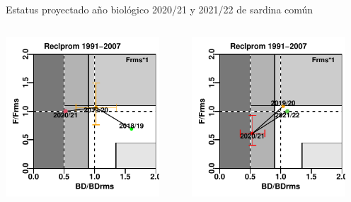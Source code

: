 \documentclass[
  ignorenonframetext,
]{beamer}
\begin{document}
\begin{frame}{Estatus proyectado año biológico 2020/21 y 2021/22 de
sardina común}
\protect\hypertarget{estatus-proyectado-auxf1o-bioluxf3gico-202021-y-202122-de-sardina-comuxfan}{}
\begin{columns}
\begin{center} \includegraphics[width=0.9\textwidth]{FigurasInforme_Marzo/Fig44a_sept-1.pdf}\end{center}
\begin{center} \includegraphics[width=0.9\textwidth]{FigurasInforme_Marzo/Fig45a_marzo-1.pdf}\end{center}
\end{columns}


\end{frame}
\end{document}
